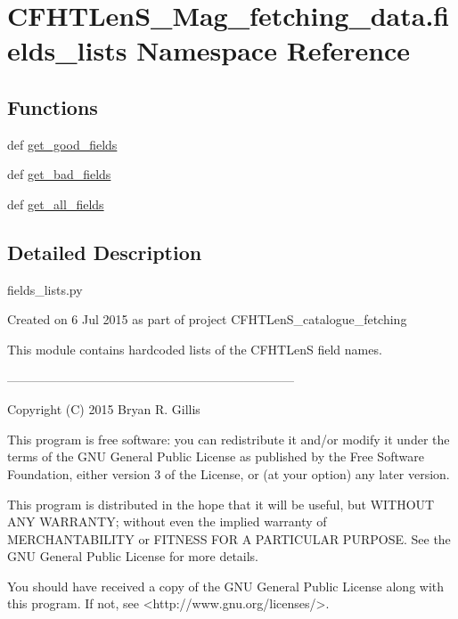\hypertarget{namespaceCFHTLenS__Mag__fetching__data_1_1fields__lists}{\section{C\-F\-H\-T\-Len\-S\-\_\-\-Mag\-\_\-fetching\-\_\-data.\-fields\-\_\-lists Namespace Reference}
\label{namespaceCFHTLenS__Mag__fetching__data_1_1fields__lists}
}
\subsection*{Functions}
\begin{DoxyCompactItemize}
\item 
def \hyperlink{namespaceCFHTLenS__Mag__fetching__data_1_1fields__lists_ab74f5024e79c971ece9580d3637d22a4}{get\-\_\-good\-\_\-fields}
\item 
def \hyperlink{namespaceCFHTLenS__Mag__fetching__data_1_1fields__lists_a0d0cdfbac7217965c0884213c567b75c}{get\-\_\-bad\-\_\-fields}
\item 
def \hyperlink{namespaceCFHTLenS__Mag__fetching__data_1_1fields__lists_a872d360bad7302ea510e9d81ad04fc2f}{get\-\_\-all\-\_\-fields}
\end{DoxyCompactItemize}


\subsection{Detailed Description}
\begin{DoxyVerb}fields_lists.py

    Created on 6 Jul 2015 as part of project CFHTLenS_catalogue_fetching
    
    This module contains hardcoded lists of the CFHTLenS field names.

    ---------------------------------------------------------------------

    Copyright (C) 2015  Bryan R. Gillis

    This program is free software: you can redistribute it and/or modify
     it under the terms of the GNU General Public License as published by
     the Free Software Foundation, either version 3 of the License, or
     (at your option) any later version.

     This program is distributed in the hope that it will be useful,
     but WITHOUT ANY WARRANTY; without even the implied warranty of
     MERCHANTABILITY or FITNESS FOR A PARTICULAR PURPOSE.  See the
     GNU General Public License for more details.

    You should have received a copy of the GNU General Public License
    along with this program.  If not, see <http://www.gnu.org/licenses/>.\end{DoxyVerb}
 

